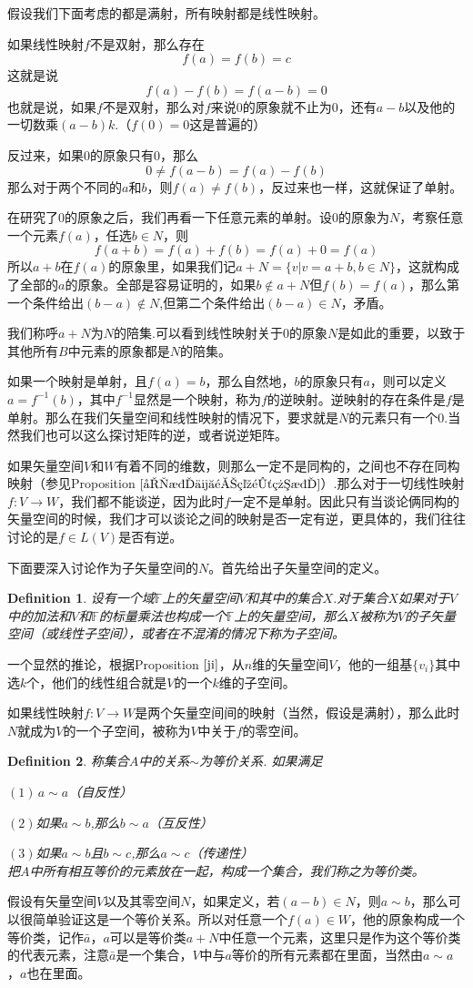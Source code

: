 \documentclass[11pt,a4paper,openany]{book}%
\theoremstyle{plain}%
\newtheorem{defi}{Definition}[chapter]%
\newcommand{\NO}[1]{{$(#1)$}}%
\newcommand{\pref}[1]{{\rm Proposition} $\ref{#1}$}
\begin{document}
假设我们下面考虑的都是满射，所有映射都是线性映射。

如果线性映射$f$不是双射，那么存在
\[
f(a)=f(b)=c
\]
这就是说
\[
f(a)-f(b)=f(a-b)=0
\]
也就是说，如果$f$不是双射，那么对$f$来说$0$的原象就不止为0，还有$a-b$以及他的一切数乘$(a-b)k$.（$f(0)=0$这是普遍的）

反过来，如果0的原象只有0，那么
\[
0 \neq f(a-b)=f(a)-f(b)
\]
那么对于两个不同的$a$和$b$，则$f(a)\neq f(b)$，反过来也一样，这就保证了单射。

在研究了$0$的原象之后，我们再看一下任意元素的单射。设0的原象为$N$，考察任意一个元素$f(a)$，任选$b\in N$，则
\[
f(a+b)=f(a)+f(b)=f(a)+0=f(a)
\]
所以$a+b$在$f(a)$的原象里，如果我们记$a+N=\{v|v=a+b,b\in N\}$，这就构成了全部的$a$的原象。全部是容易证明的，如果$b\notin a+N$但$f(b)=f(a)$，那么第一个条件给出$(b-a) \notin N$,但第二个条件给出$(b-a) \in N$，矛盾。

我们称呼$a+N$为$N$的{\kaishu 陪集}.可以看到线性映射关于0的原象$N$是如此的重要，以致于其他所有$B$中元素的原象都是$N$的陪集。

如果一个映射是单射，且$f(a)=b$，那么自然地，$b$的原象只有$a$，则可以定义$a=f^{-1}(b)$，其中$f^{-1}$显然是一个映射，称为$f$的逆映射。逆映射的存在条件是$f$是单射。那么在我们矢量空间和线性映射的情况下，要求就是$N$的元素只有一个0.当然我们也可以这么探讨矩阵的逆，或者说逆矩阵。

如果矢量空间$V$和$W$有着不同的维数，则那么一定不是同构的，之间也不存在同构映射（参见\pref{同构传递空间结构}）.那么对于一切线性映射$f:V\rightarrow W$，我们都不能谈逆，因为此时$f$一定不是单射。因此只有当谈论俩同构的矢量空间的时候，我们才可以谈论之间的映射是否一定有逆，更具体的，我们往往讨论的是$f\in L(V)$是否有逆。

下面要深入讨论作为子矢量空间的$N$。首先给出子矢量空间的定义。
\begin{defi}
设有一个域$\mathbb{F}$上的矢量空间$V$和其中的集合$X$.对于集合$X$如果对于$V$中的加法和$V$和$\mathbb{F}$的标量乘法也构成一个$\mathbb{F}$上的矢量空间，那么$X$被称为$V$的子矢量空间（或线性子空间），或者在不混淆的情况下称为子空间。
\end{defi}
\indent 一个显然的推论，根据\pref{ji}，从$n$维的矢量空间$V$，他的一组基$\{v_i\}$其中选$k$个，他们的线性组合就是$V$的一个$k$维的子空间。

如果线性映射$f:V\rightarrow W$是两个矢量空间间的映射（当然，假设是满射），那么此时$N$就成为$V$的一个子空间，被称为$V$中关于$f$的零空间。
\begin{defi}
称集合$A$中的关系$\sim$为等价关系. 如果满足

\NO{1}$\,a\sim a$（自反性）

\NO{2}如果$a\sim b$,那么$b\sim a$（互反性）

\NO{3}如果$a\sim b$且$b\sim c$,那么$a\sim c$（传递性）\\
把$A$中所有相互等价的元素放在一起，构成一个集合，我们称之为等价类。
\end{defi}
假设有矢量空间$V$以及其零空间$N$，如果定义，若$(a-b)\in N$，则$a\sim b$，那么可以很简单验证这是一个等价关系。所以对任意一个$f(a)\in W$，他的原象构成一个等价类，记作$\bar{a}$，$a$可以是等价类$a+N$中任意一个元素，这里只是作为这个等价类的代表元素，注意$\bar{a}$是一个集合，$V$中与$a$等价的所有元素都在里面，当然由$a\sim a$，$a$也在里面。
\end{document}
